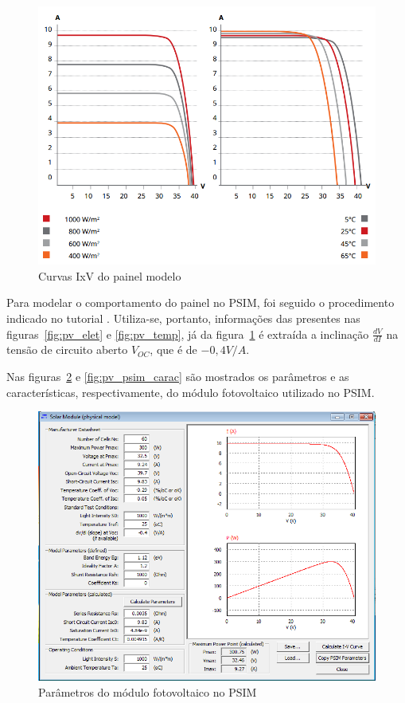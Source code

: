 \documentclass[
	12pt,				%
	openright,			%
	onseside,
	a4paper,			%
	english,			%
	french,				%
	spanish,			%
	brazil,				%
	]{abntex2}
\begin{document}
\begin{figure}[htbp]%
	\begin{center}%
		\includegraphics[width=0.55 \linewidth]{AV_canad_300}
		\caption{Curvas IxV do painel modelo \cite{Canadian_Datasheet}}
		\label{fig:IV_pv_cs}
	\end{center}
\end{figure}

Para modelar o comportamento do painel no PSIM, foi seguido o procedimento indicado no tutorial \cite{PSIM_PV}. Utiliza-se, portanto, informações das presentes nas figuras~\ref{fig:pv_elet} e \ref{fig:pv_temp}, já da figura~\ref{fig:IV_pv_cs} é extraída a inclinação $\frac{dV}{dI}$ na tensão de circuito aberto $V_{OC}$, que é de $-0,4 V/A$.

Nas figuras~\ref{fig:pv_psim_param} e \ref{fig:pv_psim_carac} são mostrados os parâmetros e as características, respectivamente, do módulo fotovoltaico utilizado no PSIM.

\begin{figure}[htbp]%
	\begin{center}%
		\includegraphics[width=0.55 \linewidth]{PV_param}
		\caption{Parâmetros do módulo fotovoltaico no PSIM}
		\label{fig:pv_psim_param}
	\end{center}
\end{figure}
\end{document}
